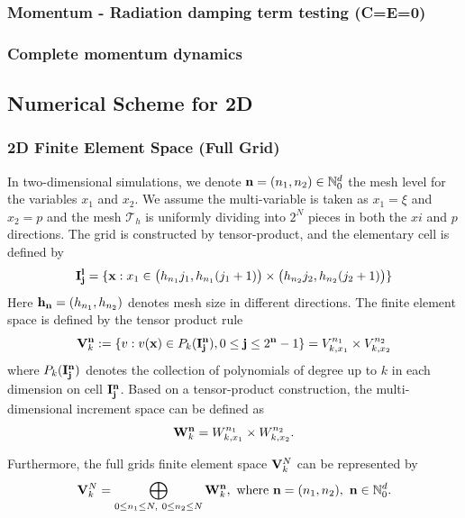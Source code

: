 \documentclass[preprint,11pt]{elsarticle}
\newcommand{\bx}{{\bf x}}
\begin{document}
\subsubsection{Momentum - Radiation damping term testing (C=E=0)}


\subsubsection{Complete momentum dynamics}


\subsection{Numerical Scheme for 2D} 


\subsubsection{2D Finite Element Space (Full Grid)}
\label{sec:2d-fe-space}
In two-dimensional simulations, we denote ${\bf n}=(n_1,n_2)\in\mathbb{N}_0^d$ the mesh level for the variables $x_1$ and $x_2$.  We assume the multi-variable is taken as $x_1 = \xi$ and $x_2 = p$ and the mesh $\mathcal{T}_h$ is uniformly dividing into $2^N$ pieces in both the $xi$ and $p$ directions. The grid is constructed by tensor-product, and the elementary cell is defined by 
\begin{equation}
\label{elementarycell}
{\bf I}_{\bf j}^{\bf l}=\{{\bf x}:
x_1\in\big(h_{n_1}j_1,h_{n_1}(j_1+1)\big)\times\big(h_{n_2}j_2,h_{n_2}(j_2+1)\big)\}
\end{equation}
Here ${\bf h}_{\bf n}=(h_{n_1},h_{n_2})$ denotes mesh size in different directions. 
The finite element space is defined by the tensor product rule
\begin{equation}
\label{finiteelementspace}
{\bf V}_k^{\bf n}:=\{v:v(\bx)\in {P}_k({\bf I}_{\bf j}^{\bf n}),0\le{\bf j}\le 2^{\bf n}-1\}=V^{n_1}_{k,x_1}\times V^{n_2}_{k,x_2}
\end{equation}
where $P_k(\bf I_{\bf j}^{\bf n})$ denotes the collection of polynomials of degree up to $k$ in each dimension on cell ${\bf I}_{\bf j}^{\bf n}$. 
Based on a tensor-product construction, the multi-dimensional increment space can be defined as
\begin{eqnarray}
{\bf W}_k^{\bf n}=W_{k,x_1}^{n_1}\times W_{k,x_2}^{n_2}. 
\end{eqnarray}

Furthermore, the full grids finite element space ${\bf V}_k^{N}$ can be represented by
\begin{eqnarray}
{\bf V}_k^{N}=\bigoplus_{0\le n_1\le N, \ 0\le n_2\le N}{\bf W}_k^{\bf n},\text{ where } {\bf n} = (n_1,n_2), \ {\bf n}\in\mathbb{N}_0^d.
\label{Def:FG2D}
\end{eqnarray}
\end{document}
